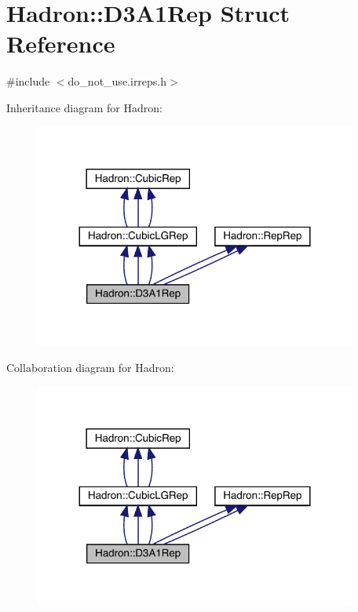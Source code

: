 \hypertarget{structHadron_1_1D3A1Rep}{}\section{Hadron\+:\+:D3\+A1\+Rep Struct Reference}
\label{structHadron_1_1D3A1Rep}


{\ttfamily \#include $<$do\+\_\+not\+\_\+use.\+irreps.\+h$>$}



Inheritance diagram for Hadron\+:
\nopagebreak
\begin{figure}[H]
\begin{center}
\leavevmode
\includegraphics[width=300pt]{d7/d78/structHadron_1_1D3A1Rep__inherit__graph}
\end{center}
\end{figure}


Collaboration diagram for Hadron\+:
\nopagebreak
\begin{figure}[H]
\begin{center}
\leavevmode
\includegraphics[width=300pt]{de/d31/structHadron_1_1D3A1Rep__coll__graph}
\end{center}
\end{figure}
